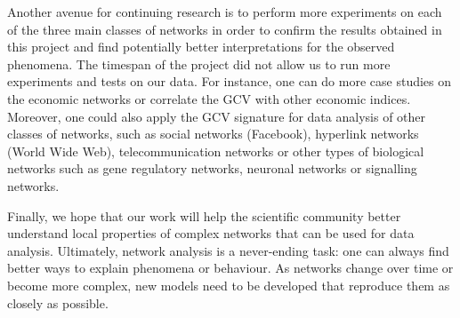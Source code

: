 Another avenue for continuing research is to perform more experiments on each of the three main classes of networks in order to confirm the results obtained in this project and find potentially better interpretations for the observed phenomena. The timespan of the project did not allow us to run more experiments and tests on our data. For instance, one can do more case studies on the economic networks or correlate the GCV with other economic indices. Moreover, one could also apply the GCV signature for data analysis of other classes of networks, such as social networks (Facebook), hyperlink networks (World Wide Web), telecommunication networks or other types of biological networks such as gene regulatory networks, neuronal networks or signalling networks.

Finally, we hope that our work will help the scientific community better understand local properties
of complex networks that can be used for data analysis. Ultimately, network analysis is a never-ending task:
one can always find better ways to explain phenomena or behaviour. As networks change over time or become more complex, new models need to be
developed that reproduce them as closely as possible.
